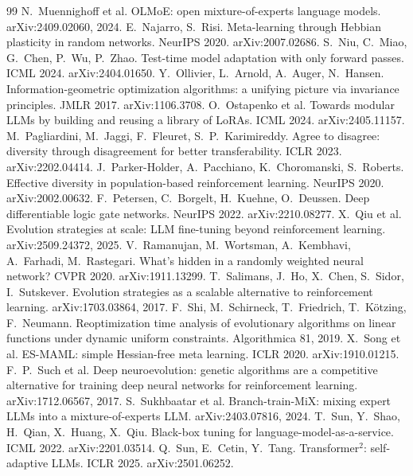 \documentclass[11pt,a4paper]{article}
\theoremstyle{definition}
\theoremstyle{plain}
\theoremstyle{remark}
\begin{document}
\begin{thebibliography}{99}
 N.~Muennighoff et al. OLMoE: open mixture-of-experts language models. arXiv:2409.02060, 2024.
 E.~Najarro, S.~Risi. Meta-learning through Hebbian plasticity in random networks. NeurIPS 2020. arXiv:2007.02686.
 S.~Niu, C.~Miao, G.~Chen, P.~Wu, P.~Zhao. Test-time model adaptation with only forward passes. ICML 2024. arXiv:2404.01650.
 Y.~Ollivier, L.~Arnold, A.~Auger, N.~Hansen. Information-geometric optimization algorithms: a unifying picture via invariance principles. JMLR 2017. arXiv:1106.3708.
 O.~Ostapenko et al. Towards modular LLMs by building and reusing a library of LoRAs. ICML 2024. arXiv:2405.11157.
 M.~Pagliardini, M.~Jaggi, F.~Fleuret, S.~P.~Karimireddy. Agree to disagree: diversity through disagreement for better transferability. ICLR 2023. arXiv:2202.04414.
 J.~Parker-Holder, A.~Pacchiano, K.~Choromanski, S.~Roberts. Effective diversity in population-based reinforcement learning. NeurIPS 2020. arXiv:2002.00632.
 F.~Petersen, C.~Borgelt, H.~Kuehne, O.~Deussen. Deep differentiable logic gate networks. NeurIPS 2022. arXiv:2210.08277.
 X.~Qiu et al. Evolution strategies at scale: LLM fine-tuning beyond reinforcement learning. arXiv:2509.24372, 2025.
 V.~Ramanujan, M.~Wortsman, A.~Kembhavi, A.~Farhadi, M.~Rastegari. What's hidden in a randomly weighted neural network? CVPR 2020. arXiv:1911.13299.
 T.~Salimans, J.~Ho, X.~Chen, S.~Sidor, I.~Sutskever. Evolution strategies as a scalable alternative to reinforcement learning. arXiv:1703.03864, 2017.
 F.~Shi, M.~Schirneck, T.~Friedrich, T.~Kötzing, F.~Neumann. Reoptimization time analysis of evolutionary algorithms on linear functions under dynamic uniform constraints. Algorithmica 81, 2019.
 X.~Song et al. ES-MAML: simple Hessian-free meta learning. ICLR 2020. arXiv:1910.01215.
 F.~P.~Such et al. Deep neuroevolution: genetic algorithms are a competitive alternative for training deep neural networks for reinforcement learning. arXiv:1712.06567, 2017.
 S.~Sukhbaatar et al. Branch-train-MiX: mixing expert LLMs into a mixture-of-experts LLM. arXiv:2403.07816, 2024.
 T.~Sun, Y.~Shao, H.~Qian, X.~Huang, X.~Qiu. Black-box tuning for language-model-as-a-service. ICML 2022. arXiv:2201.03514.
 Q.~Sun, E.~Cetin, Y.~Tang. Transformer$^2$: self-adaptive LLMs. ICLR 2025. arXiv:2501.06252.

\end{thebibliography}
\end{document}
